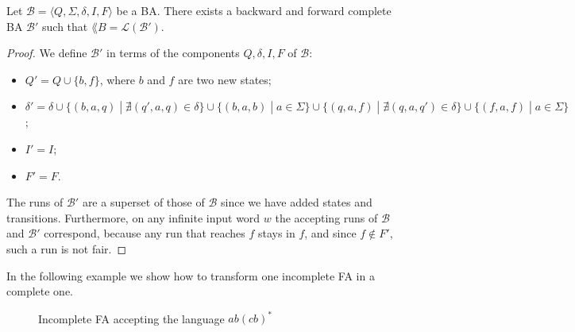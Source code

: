 \begin{proposition}
\label{proposition:complete-BA}
Let $\mathcal{B} = \langle Q, \Sigma, \delta, I, F\rangle$ be a BA.
There exists a backward and forward complete BA $\mathcal{B}'$ such that
$\lang{B} = \mathcal{L}(\mathcal{B}')$.
\end{proposition}

\begin{proof}
We define $\mathcal{B}'$ in terms of the components $Q, \delta, I, F$ of $\mathcal{B}$:
\begin{itemize}
\item $Q' = Q \cup \{b, f\}$, where $b$ and $f$ are two new states;
\item $\delta' = \delta \cup \{(b,a,q) \;|\; \nexists (q', a, q) \in \delta\} \cup
\{(b, a, b) \;|\; a \in \Sigma \}\cup \{(q,a,f) \;|\; \nexists (q,a,q') \in \delta\}
\cup \{(f,a,f) \;|\; a \in \Sigma\}$;
\item $I' = I$;
\item $F' = F$.
\end{itemize}
The runs of $\mathcal{B}'$ are a superset of those of $\mathcal{B}$ since we
have added states and transitions.
Furthermore, on any infinite input word $w$ the accepting runs of $\mathcal{B}$
and $\mathcal{B}'$ correspond, because any run that reaches $f$ stays in $f$,
and since $f \notin F'$, such a run is not fair.
\end{proof}

In the following example we show how to transform one incomplete FA
in a complete one.

\begin{figure}[h]
\centering
{}
\caption{Incomplete FA accepting the language $ab(cb)^*$}
\label{fig:incomplete}
\end{figure}

